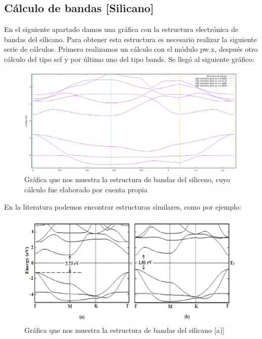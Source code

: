 
\newpage

\subsection{Cálculo de bandas [Silicano]}

En el siguiente apartado damos una gráfica con la estructura electrónica de bandas del silicano. 
Para obtener esta estructura es necesario realizar la siguiente serie de cálculos.
Primero realizamos un cálculo con el módulo pw.x, después otro cálculo 
del tipo scf y por último uno del tipo bands. Se llegó al siguiente gráfico:

\begin{figure}[H]
    \centering
    \includegraphics[scale=0.45]{images_silicano/bands_structure_silicane_10_bands_relax.png}
    \caption{Gráfica que nos muestra la estructura de bandas del siliceno, cuyo cálculo fue elaborado por cuenta propia}
\end{figure}

En la literatura podemos encontrar estructuras similares, como por ejemplo:

\begin{figure}[H]
    \centering
    \includegraphics[scale=0.5]{images_silicano/Bandstructure-of-a-silicane-and-b-germanane.png}
    \caption{Gráfica que nos muestra la estructura de bandas del silicano [a)] \cite{trivedi2014silicene} }
\end{figure}

